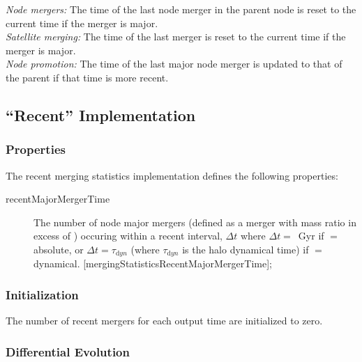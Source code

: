\noindent\emph{Node mergers:} The time of the last \gls{node} merger in the parent \gls{node} is reset to the current time if the merger is major.\\

\noindent\emph{Satellite merging:} The time of the last merger is reset to the current time if the merger is major.\\

\noindent\emph{Node promotion:} The time of the last major \gls{node} merger is updated to that of the parent if that time is more recent.\\

\subsection{``Recent'' Implementation}

\subsubsection{Properties}

The recent merging statistics implementation defines the following properties:
\begin{description}
 \item [{\normalfont \ttfamily recentMajorMergerTime}] The number of node major mergers (defined as a merger with mass ratio in excess of {\normalfont \ttfamily [nodeMajorMergerFraction]}) occuring within a recent interval, $\Delta t$ where $\Delta t = ${\normalfont \ttfamily [nodeRecentMajorMergerInterval]}~Gyr if {\normalfont \ttfamily [nodeRecentMajorMergerIntervalType]}$=${\normalfont \ttfamily absolute}, or $\Delta t = ${\normalfont \ttfamily [nodeRecentMajorMergerInterval]}$\tau_{\mathrm dyn}$ (where $\tau_{\mathrm dyn}$ is the halo dynamical time) if {\normalfont \ttfamily [nodeRecentMajorMergerIntervalType]}$=${\normalfont \ttfamily dynamical}. [{\normalfont \ttfamily mergingStatisticsRecentMajorMergerTime}];
\end{description}

\subsubsection{Initialization}

The number of recent mergers for each output time are initialized to zero.

\subsubsection{Differential Evolution}

